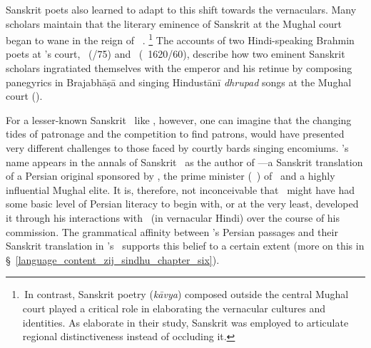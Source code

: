 
Sanskrit poets also learned to adapt to this shift towards the vernaculars. Many scholars maintain that the literary eminence of Sanskrit at the Mughal court began to wane in the reign of \Shahjahan\
\parencites[\eg][]{PollockDeathofSanskrit, Truschke}.%
\footnote{\,In contrast, Sanskrit poetry (\textit{kāvya}) composed outside the central Mughal court played a critical role in elaborating the vernacular cultures and identities. As \textcite{BronnerShulman} elaborate in their study, Sanskrit was employed to articulate regional distinctiveness instead of occluding it.} The accounts of two Hindi-speaking Brahmin poets at \Shahjahan's court, \KavindracaryaSaravati\ (\fl {}/75) and \JagannathaPanditaraja\ (\fl \circa\ 1620/60), describe how two eminent Sanskrit scholars ingratiated themselves with the emperor and his retinue by composing panegyrics in Braja\-bhāṣā and singing Hindustānī \textit{dhrupad} songs at the Mughal court (\cite[50--53]{Truschke}).

For a lesser-known Sanskrit \jyotisa\ like \Nityananda, however, one can imagine that the changing tides of patronage and the competition to find patrons, would have presented very different challenges to those faced by courtly bards singing encomiums. \Nityananda's name appears in the annals of Sanskrit \Jyotihsastra\ as the author of \Siddhantasindhu---a Sanskrit translation of a Persian original sponsored by \AsafKhanshort, the prime minister (\vazir\idafaconsonant\ \azam) of \Shahjahan\ and a highly influential Mughal elite. It is, therefore, not inconceivable that \Nityananda\ might have had some basic level of Persian literacy to begin with, or at the very least, developed it through his interactions with \MullaFarid\ (in vernacular Hindi) over the course of his commission. The grammatical affinity between \MullaFarid's Persian passages and their Sanskrit translation in \Nityananda's \Siddhantasindhu\ supports this belief to a certain extent (more on this in \S~\ref{language_content_zij_sindhu_chapter_six}). 

